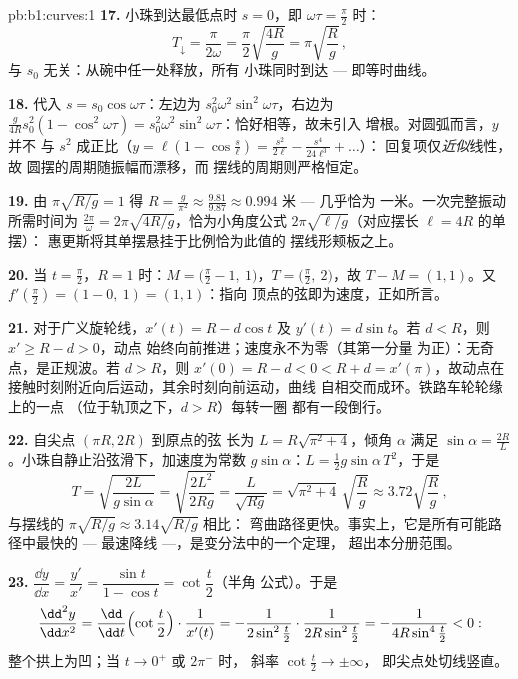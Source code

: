 \begin{solution}{pb:b1:curves:1}
\textbf{17.} 小珠到达最低点时 $s = 0$，即
$\omega\tau = \frac\pi2$ 时：
\[
T_{\downarrow} = \frac{\pi}{2\omega}
= \frac\pi2\sqrt{\frac{4R}{g}} = \pi\sqrt{\frac Rg}\,,
\]
与 $s_0$ 无关：从碗中任一处释放，所有
小珠同时到达 --- 即等时曲线。

\textbf{18.} 代入 $s = s_0\cos\omega\tau$：左边为
$s_0^2\omega^2\sin^2\omega\tau$，右边为
$\frac{g}{4R}s_0^2(1 - \cos^2\omega\tau) =
s_0^2\omega^2\sin^2\omega\tau$：恰好相等，故未引入
增根。对圆弧而言，$y$ 并不
与 $s^2$ 成正比（$y = \ell(1 - \cos\frac s\ell) =
\frac{s^2}{2\ell} - \frac{s^4}{24\ell^3} + \dots$）：
回复项仅\emph{近似}线性，故
圆摆的周期随振幅而漂移，而
摆线的周期则严格恒定。

\textbf{19.} 由 $\pi\sqrt{R/g} = 1$ 得 $R = \frac{g}{\pi^2}
\approx \frac{9.81}{9.87} \approx 0.994$ 米 --- 几乎恰为
一米。一次完整振动所需时间为 $\frac{2\pi}\omega =
2\pi\sqrt{4R/g}$，恰为小角度公式
$2\pi\sqrt{\ell/g}$（对应摆长 $\ell = 4R$ 的单摆）：
惠更斯将其单摆悬挂于比例恰为此值的
摆线形颊板之上。

\textbf{20.} 当 $t = \frac\pi2$，$R = 1$ 时：$M = \bigl(\frac\pi2 -
1,\ 1\bigr)$，$T = \bigl(\frac\pi2,\ 2\bigr)$，故 $T - M = (1,
1)$。又 $f'(\frac\pi2) = (1 - 0,\ 1) = (1, 1)$：指向
顶点的弦即为速度，正如所言。

\textbf{21.} 对于广义旋轮线，$x'(t) = R - d\cos t$ 及 $y'(t)
= d\sin t$。若 $d < R$，则 $x' \geq R - d > 0$，动点
始终向前推进；速度永不为零（其第一分量
为正）：无奇点，是正规波。若 $d > R$，则 $x'(0)
= R - d < 0 < R + d = x'(\pi)$，故动点在
接触时刻附近向后运动，其余时刻向前运动，曲线
自相交而成环。铁路车轮轮缘上的一点
（位于轨顶之下，$d > R$）每转一圈
都有一段倒行。

\textbf{22.} 自尖点 $(\pi R, 2R)$ 到原点的弦
长为 $L = R\sqrt{\pi^2 + 4}$，倾角 $\alpha$ 满足
$\sin\alpha = \frac{2R}{L}$。小珠自静止沿弦滑下，加速度为常数
$g\sin\alpha$：$L = \frac12 g\sin\alpha\,T^2$，于是
\[
T = \sqrt{\frac{2L}{g\sin\alpha}} = \sqrt{\frac{2L^2}{2Rg}}
= \frac{L}{\sqrt{Rg}} = \sqrt{\pi^2 + 4}\,\sqrt{\frac Rg}
\approx 3.72\sqrt{\frac Rg}\,,
\]
与摆线的 $\pi\sqrt{R/g} \approx 3.14\sqrt{R/g}$ 相比：
弯曲路径更快。事实上，它是所有可能路径中最快的
--- 最速降线 ---，是变分法中的一个定理，
超出本分册范围。

\textbf{23.} $\dfrac{\dd y}{\dd x} = \dfrac{y'}{x'} =
\dfrac{\sin t}{1 - \cos t} = \cot\dfrac t2$（半角
公式）。于是
\[
\frac{\dd^2y}{\dd x^2}
= \frac{\dd}{\dd t}\Bigl(\cot\frac t2\Bigr)\cdot\frac{1}{x'(t)}
= -\frac{1}{2\sin^2\frac t2}\cdot\frac{1}{2R\sin^2\frac t2}
= -\frac{1}{4R\sin^4\frac t2} < 0 :
\]
整个拱上为凹；当 $t \to 0^+$ 或 $2\pi^-$ 时，
斜率 $\cot\frac t2 \to \pm\infty$，
即尖点处切线竖直。


\end{solution}

